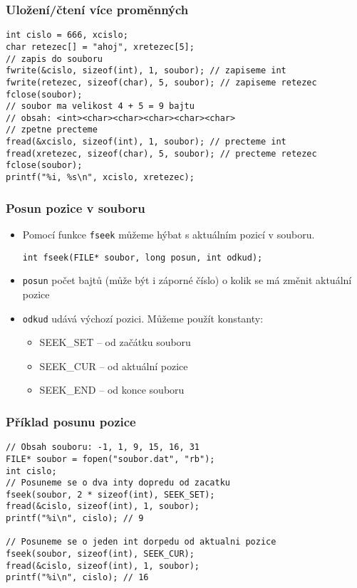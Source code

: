 \documentclass{beamer}
\newenvironment{itemizex}%
  {\large \begin{itemize}%
    \setlength{\itemsep}{8pt}%
    \setlength{\parskip}{8pt}}%
  {\end{itemize}}
\begin{document}
\begin{frame}[t,fragile]\frametitle{Uložení/čtení více proměnných} 
\begin{verbatim} 
int cislo = 666, xcislo;
char retezec[] = "ahoj", xretezec[5];
// zapis do souboru
fwrite(&cislo, sizeof(int), 1, soubor); // zapiseme int
fwrite(retezec, sizeof(char), 5, soubor); // zapiseme retezec
fclose(soubor);
// soubor ma velikost 4 + 5 = 9 bajtu
// obsah: <int><char><char><char><char><char>
// zpetne precteme
fread(&xcislo, sizeof(int), 1, soubor); // precteme int
fread(xretezec, sizeof(char), 5, soubor); // precteme retezec
fclose(soubor);
printf("%i, %s\n", xcislo, xretezec);
\end{verbatim}
\end{frame}


\begin{frame}[t,fragile]\frametitle{Posun pozice v souboru} 
    \begin{itemizex}
        \item Pomocí funkce \texttt{fseek} můžeme hýbat s aktuálním pozicí v souboru.
\begin{verbatim} 
int fseek(FILE* soubor, long posun, int odkud);
\end{verbatim}
        \item \texttt{posun} počet bajtů (může být i záporné číslo) o kolik se má změnit aktuální pozice
        \item \texttt{odkud} udává výchozí pozici. Můžeme použít konstanty:
        \begin{itemize}
            \item SEEK\_SET -- od začátku souboru 
            \item SEEK\_CUR -- od aktuální pozice
            \item SEEK\_END -- od konce souboru
        \end{itemize}
    \end{itemizex}
\end{frame}


\begin{frame}[t,fragile]\frametitle{Příklad posunu pozice} 
\begin{verbatim} 
// Obsah souboru: -1, 1, 9, 15, 16, 31
FILE* soubor = fopen("soubor.dat", "rb");
int cislo;
// Posuneme se o dva inty dopredu od zacatku
fseek(soubor, 2 * sizeof(int), SEEK_SET);
fread(&cislo, sizeof(int), 1, soubor);
printf("%i\n", cislo); // 9

// Posuneme se o jeden int dorpedu od aktualni pozice
fseek(soubor, sizeof(int), SEEK_CUR);
fread(&cislo, sizeof(int), 1, soubor);
printf("%i\n", cislo); // 16
\end{verbatim}
\end{frame}
\end{document}
